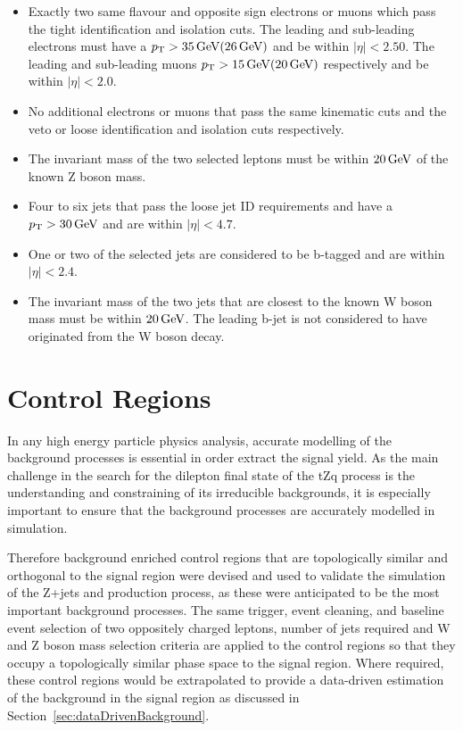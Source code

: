 \begin{itemize}
\item Exactly two same flavour and opposite sign electrons or muons which pass the tight identification and isolation cuts. The leading and sub-leading electrons must have a $p_{\mathrm{T}} > 35\,\text{Ge\hspace{-.08em}V} (26\,\text{Ge\hspace{-.08em}V})$ and be within $|\eta| < 2.50$. The leading and sub-leading muons $p_{\mathrm{T}} > 15\,\text{Ge\hspace{-.08em}V} (20\,\text{Ge\hspace{-.08em}V})$ respectively and be within $|\eta| < 2.0$.
\item  No additional electrons or muons that pass the same kinematic cuts and the veto or loose identification and isolation cuts respectively. 
\item The invariant mass of the two selected leptons must be within $20\,\text{Ge\hspace{-.08em}V}$ of the known Z boson mass.
\item Four to six jets that pass the loose jet ID requirements and have a $p_{\mathrm{T}} > 30\,\text{Ge\hspace{-.08em}V}$ and are within $|\eta| < 4.7$.
\item One or two of the selected jets are considered to be b-tagged and are within $|\eta| < 2.4$.
\item The invariant mass of the two jets that are closest to the known W boson mass must be within $20\,\text{Ge\hspace{-.08em}V}$. The leading b-jet is not considered to have originated from the W boson decay.
\end{itemize}

\section{Control Regions}\label{sec:controlRegions}
In any high energy particle physics analysis, accurate modelling of the background processes is essential in order extract the signal yield.
As the main challenge in the search for the dilepton final state of the tZq process is the understanding and constraining of its irreducible backgrounds, it is especially important to ensure that the background processes are accurately modelled in simulation.

Therefore background enriched control regions that are topologically similar and orthogonal to the signal region were devised and used to validate the simulation of the Z+jets and \ttbar production process, as these were anticipated to be the most important background processes.
The same trigger, event cleaning, and baseline event selection of two oppositely charged leptons, number of jets required and W and Z boson mass selection criteria are applied to the control regions so that they occupy a topologically similar phase space to the signal region.
Where required, these control regions would be extrapolated to provide a data-driven estimation of the background in the signal region as discussed in Section~\ref{sec:dataDrivenBackground}.

